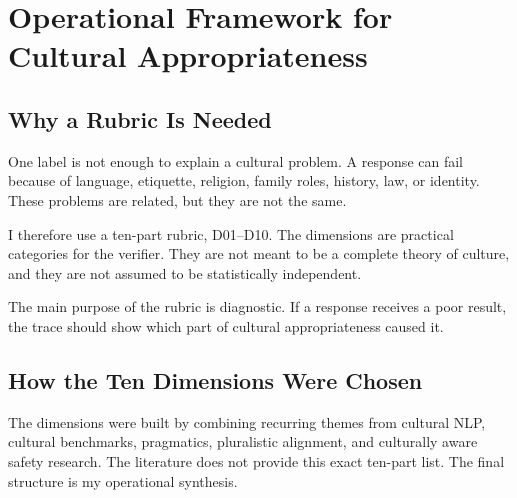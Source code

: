 \chapter{Operational Framework for Cultural Appropriateness}
\label{chap:framework}

\section{Why a Rubric Is Needed}

One label is not enough to explain a cultural problem. A response can fail because of language, etiquette, religion, family roles, history, law, or identity. These problems are related, but they are not the same.

I therefore use a ten-part rubric, D01--D10. The dimensions are practical categories for the verifier. They are not meant to be a complete theory of culture, and they are not assumed to be statistically independent.

The main purpose of the rubric is diagnostic. If a response receives a poor result, the trace should show which part of cultural appropriateness caused it.

\section{How the Ten Dimensions Were Chosen}

The dimensions were built by combining recurring themes from cultural NLP, cultural benchmarks, pragmatics, pluralistic alignment, and culturally aware safety research. The literature does not provide this exact ten-part list. The final structure is my operational synthesis.

